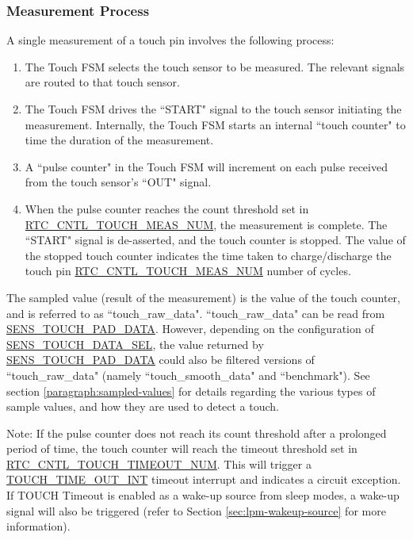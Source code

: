 \documentclass[main\_\_EN.tex]{subfiles}
\begin{document}
\subsubsection{Measurement Process}
\label{paragraph:measurement-process}

A single measurement of a touch pin involves the following process:

\begin{enumerate}
    \item The Touch FSM selects the touch sensor to be measured. The relevant signals are routed to that touch sensor.
    \item The Touch FSM drives the ``START" signal to the touch sensor initiating the measurement. Internally, the Touch FSM starts an internal ``touch counter" to time the duration of the measurement.
    \item A ``pulse counter" in the Touch FSM will increment on each pulse received from the touch sensor's ``OUT" signal.
    \item When the pulse counter reaches the count threshold set in \hyperref[fielddesc:RTCCNTLTOUCHMEASNUM]{RTC\_CNTL\_TOUCH\_MEAS\_NUM}, the measurement is complete. The ``START" signal is de-asserted, and the touch counter is stopped. The value of the stopped touch counter indicates the time taken to charge/discharge the touch pin \hyperref[fielddesc:RTCCNTLTOUCHMEASNUM]{RTC\_CNTL\_TOUCH\_MEAS\_NUM} number of cycles.
\end{enumerate}

The sampled value (result of the measurement) is the value of the touch counter, and is referred to as ``touch\_raw\_data". ``touch\_raw\_data" can be read from \hyperref[fielddesc:SENSTOUCHPAD1DATA]{SENS\_TOUCH\_PAD\_DATA}. However, depending on the configuration of \hyperref[fielddesc:SENSTOUCHDATASEL]{SENS\_TOUCH\_DATA\_SEL}, the value returned by \hyperref[fielddesc:SENSTOUCHPAD1DATA]{SENS\_TOUCH\_PAD\_DATA} could also be filtered versions of ``touch\_raw\_data" (namely ``touch\_smooth\_data" and ``benchmark"). See section \ref{paragraph:sampled-values} for details regarding the various types of sample values, and how they are used to detect a touch.

Note: If the pulse counter does not reach its count threshold after a prolonged period of time, the touch counter will reach the timeout threshold set in \hyperref[fielddesc:RTCCNTLTOUCHTIMEOUTNUM]{RTC\_CNTL\_TOUCH\_TIMEOUT\_NUM}. This will trigger a \hyperref[interrupt:TOUCHTIMEOUTINT]{ TOUCH\_TIME\_OUT\_INT} timeout interrupt and indicates a circuit exception. If TOUCH Timeout is enabled as a wake-up source from sleep modes, a wake-up signal will also be triggered (refer to Section \ref{sec:lpm-wakeup-source} for more information).
\end{document}
